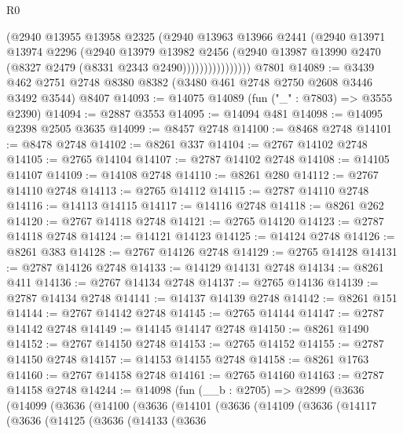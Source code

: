 \begin{lexlean}{R0}
\begin{coremodule}
                      (@2940
                        @13955
                        @13958
                        @2325
                        (@2940
                          @13963
                          @13966
                          @2441
                          (@2940
                            @13971
                            @13974
                            @2296
                            (@2940
                              @13979
                              @13982
                              @2456
                              (@2940
                                @13987
                                @13990
                                @2470
                                (@8327 @2479 (@8331 @2343 @2490))))))))))))))))
    @7801
@14089 := @3439 @462 @2751 @2748 @8380 @8382 (@3480 @461 @2748 @2750 @2608 @3446 @3492 @3544) @8407
@14093 := @14075 @14089 (fun ("_" : @7803) => @3555 @2390)
@14094 := @2887 @3553
@14095 := @14094 @481
@14098 := @14095 @2398 @2505 @3635
@14099 := @8457 @2748
@14100 := @8468 @2748
@14101 := @8478 @2748
@14102 := @8261 @337
@14104 := @2767 @14102 @2748
@14105 := @2765 @14104
@14107 := @2787 @14102 @2748
@14108 := @14105 @14107
@14109 := @14108 @2748
@14110 := @8261 @280
@14112 := @2767 @14110 @2748
@14113 := @2765 @14112
@14115 := @2787 @14110 @2748
@14116 := @14113 @14115
@14117 := @14116 @2748
@14118 := @8261 @262
@14120 := @2767 @14118 @2748
@14121 := @2765 @14120
@14123 := @2787 @14118 @2748
@14124 := @14121 @14123
@14125 := @14124 @2748
@14126 := @8261 @383
@14128 := @2767 @14126 @2748
@14129 := @2765 @14128
@14131 := @2787 @14126 @2748
@14133 := @14129 @14131 @2748
@14134 := @8261 @411
@14136 := @2767 @14134 @2748
@14137 := @2765 @14136
@14139 := @2787 @14134 @2748
@14141 := @14137 @14139 @2748
@14142 := @8261 @151
@14144 := @2767 @14142 @2748
@14145 := @2765 @14144
@14147 := @2787 @14142 @2748
@14149 := @14145 @14147 @2748
@14150 := @8261 @1490
@14152 := @2767 @14150 @2748
@14153 := @2765 @14152
@14155 := @2787 @14150 @2748
@14157 := @14153 @14155 @2748
@14158 := @8261 @1763
@14160 := @2767 @14158 @2748
@14161 := @2765 @14160
@14163 := @2787 @14158 @2748
@14244 := @14098
    (fun (__b : @2705) =>
    @2899
      (@3636
        (@14099
          (@3636
            (@14100
              (@3636
                (@14101
                  (@3636
                    (@14109
                      (@3636
                        (@14117
                          (@3636
                            (@14125
                              (@3636
                                (@14133
                                  (@3636

\end{coremodule}
\end{lexlean}
